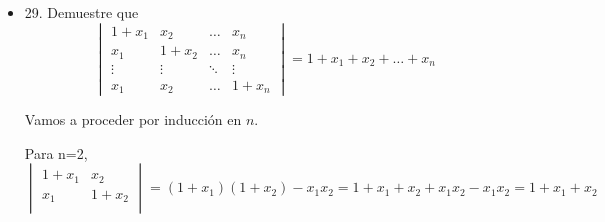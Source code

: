 \documentclass[12pt]{article}
\theoremstyle{plain}
\theoremstyle{definition}
\begin{document}
\begin{itemize}
    \item 29. Demuestre que \[\begin{vmatrix}
          1+x_1 & x_2 & \dots & x_n\\
          x_1 & 1+x_2 & \dots & x_n\\
          \vdots & \vdots & \ddots & \vdots\\
          x_1 &  x_2 & \dots & 1+x_n
        \end{vmatrix}=1+x_1+x_2+\dots+x_n
        \]
        
        Vamos a proceder por inducción en $n$. 
        
        Para n=2,\[\begin{vmatrix}
          1+x_1 & x_2 \\
          x_1 & 1+x_2 \\
        \end{vmatrix}=(1+x_1)(1+x_2)-x_1x_2=1+x_1+x_2+x_1x_2-x_1x_2=1+x_1+x_2
        \]


\end{itemize}
\end{document}
